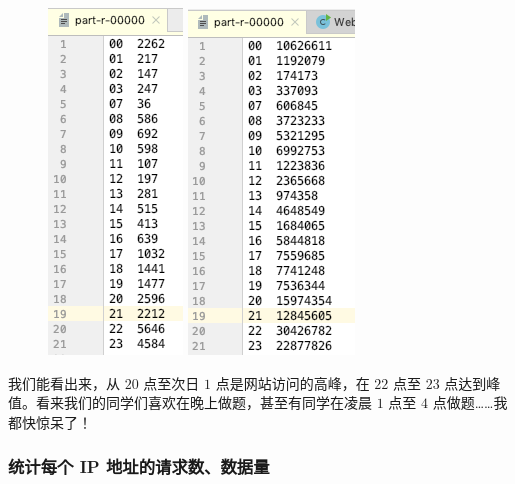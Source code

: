 \documentclass{article}
\begin{document}
\begin{figure}[!ht]
\centering
\includegraphics[scale=0.5]{image/8.png}
\includegraphics[scale=0.5]{image/9.png}
\end{figure}

我们能看出来，从 $20$ 点至次日 $1$ 点是网站访问的高峰，在 $22$ 点至 $23$ 点达到峰值。看来我们的同学们喜欢在晚上做题，甚至有同学在凌晨 $1$ 点至 $4$ 点做题……我都快惊呆了！

\subsubsection{统计每个 IP 地址的请求数、数据量}
\end{document}
